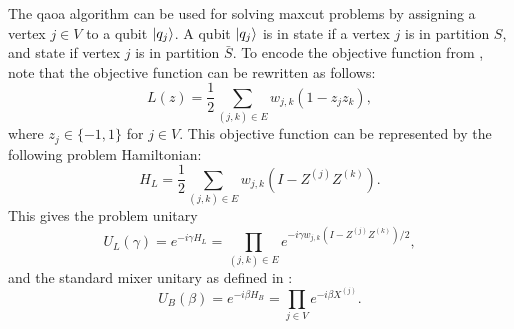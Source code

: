 The \gls{qaoa} algorithm can be used for solving \gls{maxcut} problems by assigning a vertex $j \in V$ to a qubit $\vert{q_j}\rangle$.
A qubit $\vert{q_j}\rangle$ is in state  if a vertex $j$ is in partition $S$, and state  if vertex $j$ is in partition $\bar{S}$.
To encode the objective function from , note that the objective function can be rewritten as follows:
\begin{equation}
L(z) = \frac{1}{2} \sum_{(j, k) \in E} w_{j, k}(1 - z_jz_k),
\end{equation}
where $z_j \in \{-1, 1\}$ for $j \in V$.
This objective function can be represented by the following problem Hamiltonian:
\begin{equation} \label{eqn:problem-hamiltonian}
H_L = \frac{1}{2} \sum_{(j, k) \in E} w_{j, k}(I - Z^{(j)}Z^{(k)}).
\end{equation}
This gives the problem unitary
\begin{equation} \label{eqn:problem-unitary}
U_L(\gamma) = e^{-i\gamma H_L} = \prod_{(j, k) \in E} e^{-i\gamma w_{j, k}(I - Z^{(j)}Z^{(k)})/2},
\end{equation}
and the standard mixer unitary as defined in :
\begin{equation} \label{eqn:mixer-unitary}
U_B(\beta) = e^{-i\beta H_B} = \prod_{j \in V} e^{-i\beta X^{(j)}}.
\end{equation}

